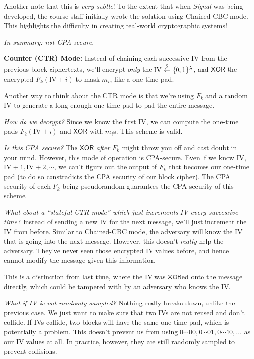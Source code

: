 \begin{remark*}
    Another note that this is \emph{very subtle}! To the extent that when \emph{Signal} was being developed, the course staff initially wrote the solution using Chained-CBC mode. This highlights the difficulty in creating real-world cryptographic systems!
\end{remark*}

\emph{In summary: not CPA secure}.

\textbf{Counter (CTR) Mode:} Instead of chaining each successive IV from the previous block ciphertexts, we'll encrypt \emph{only} the $\mathrm{IV}\overset{\$}{\leftarrow} \{0, 1\}^\lambda$, and $\mathsf{XOR}$ the encrypted $F_k(\mathrm{IV}+i)$ to mask $m_i$, like a one-time pad.

Another way to think about the CTR mode is that we're using $F_k$ and a random IV to generate a long enough one-time pad to pad the entire message.


\emph{How do we decrypt?} Since we know the first IV, we can compute the one-time pads $F_k(\mathrm{IV} + i)$ and $\mathsf{XOR}$ with $m_i$s. This scheme is valid.

\emph{Is this CPA secure?} The $\mathsf{XOR}$ \emph{after} $F_k$ might throw you off and cast doubt in your mind. However, this mode of operation is CPA-secure. Even if we know IV, $\mathrm{IV}+1, \mathrm{IV}+2, \cdots$, we can't figure out the output of $F_k$ that becomes our one-time pad (to do so constradicts the CPA security of our block cipher). The CPA security of each $F_k$ being pseudorandom guarantees the CPA security of this scheme.

\emph{What about a ``stateful CTR mode'' which just increments IV every successive time?} Instead of sending a new IV for the next message, we'll just increment the IV from before. Similar to Chained-CBC mode, the adversary will know the IV that is going into the next message. However, this doesn't \emph{really} help the adversary. They've never seen those encrypted IV values before, and hence cannot modify the message given this information.

This is a distinction from last time, where the IV was $\mathsf{XOR}$ed onto the message directly, which could be tampered with by an adversary who knows the IV.

\emph{What if IV is not randomly sampled?} Nothing really breaks down, unlike the previous case. We just want to make sure that two IVs are not reused and don't collide. If IVs collide, two blocks will have the same one-time pad, which is potentially a problem. This doesn't prevent us from using $0\cdots 00, 0\cdots 01, 0\cdots 10, \dots$ as our IV values at all. In practice, however, they are still randomly sampled to prevent collisions.

